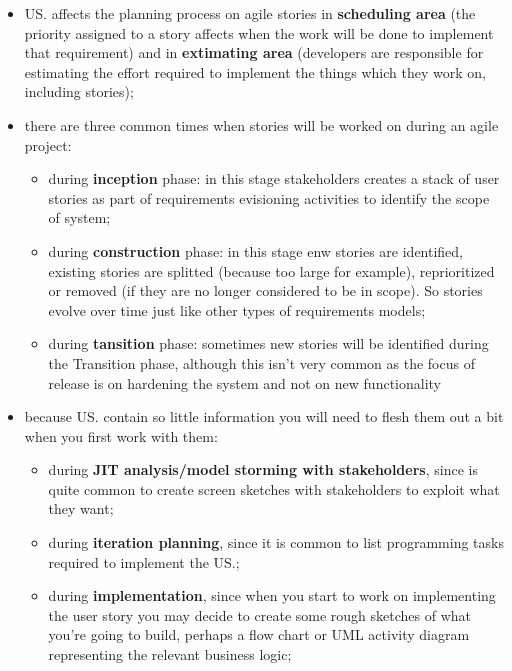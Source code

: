 \documentclass[oneside]{article}
\begin{document}
\begin{itemize}
    \item US. affects the planning process on agile stories in \textbf{scheduling area} (the priority assigned to a story affects when the work will be done to implement that requirement) and in \textbf{extimating area} (developers are responsible for estimating the effort required to implement the things which they work on, including stories);
    
    \item there are three common times when stories will be worked on during an agile project:
        \begin{itemize}
            \item during \textbf{inception} phase: in this stage stakeholders creates a stack of user stories as part of requirements evisioning activities to identify the scope of system;
            \item during \textbf{construction} phase: in this stage enw stories are identified, existing stories are splitted (because too large for example), reprioritized or removed (if they are no longer considered to be in scope). So stories evolve over time just like other types of requirements models;
            \item during \textbf{tansition} phase: sometimes new stories will be identified during the Transition phase, although this isn't very common as the focus of release is on hardening the system and not on new functionality
            \begin{figure}[!htb]
            \end{figure}
        \end{itemize}
        
    \item because US. contain so little information you will need to flesh them out a bit when you first work with them:
        \begin{itemize}
            \item during \textbf{JIT analysis/model storming with stakeholders}, since is quite common to create screen sketches with stakeholders to exploit what they want;
            \item during \textbf{iteration planning}, since it is common to list programming tasks required to implement the US.;
            \item during \textbf{implementation}, since when you start to work on implementing the user story you may decide to create some rough sketches of what you're going to build, perhaps a flow chart or UML activity diagram representing the relevant business logic;
        \end{itemize}
        

\end{itemize}
\end{document}
